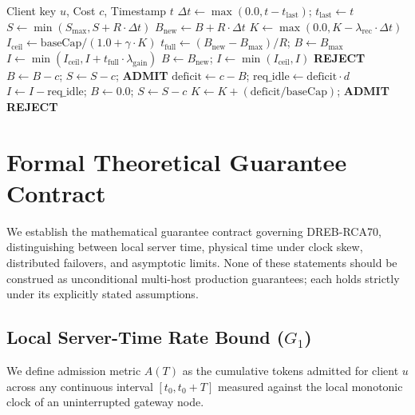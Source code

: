 \documentclass[conference]{IEEEtran}
\begin{document}
\begin{algorithm}[t]
\caption{DREB-RCA70 Atomic Admission Control}
\label{alg:dreb}
\begin{algorithmic}[1]
\REQUIRE Client key $u$, Cost $c$, Timestamp $t$
\STATE $\Delta t \leftarrow \max(0.0, t - t_{\text{last}})$; \quad $t_{\text{last}} \leftarrow t$
\STATE $S \leftarrow \min(S_{\max}, S + R \cdot \Delta t)$
\STATE $B_{\text{new}} \leftarrow B + R \cdot \Delta t$
\STATE $K \leftarrow \max(0.0, K - \lambda_{\text{rec}} \cdot \Delta t)$
\STATE $I_{\text{ceil}} \leftarrow \text{baseCap} / (1.0 + \gamma \cdot K)$
    \STATE $t_{\text{full}} \leftarrow (B_{\text{new}} - B_{\max}) / R$; \quad $B \leftarrow B_{\max}$
    \STATE $I \leftarrow \min(I_{\text{ceil}}, I + t_{\text{full}} \cdot \lambda_{\text{gain}})$
\ELSE
    \STATE $B \leftarrow B_{\text{new}}$; \quad $I \leftarrow \min(I_{\text{ceil}}, I)$
\ENDIF
{}
    \RETURN \textbf{REJECT}
\ENDIF
{}
    \STATE $B \leftarrow B - c$; \quad $S \leftarrow S - c$; \quad \RETURN \textbf{ADMIT}
\ELSE
    \STATE $\text{deficit} \leftarrow c - B$; \quad $\text{req\_idle} \leftarrow \text{deficit} \cdot d$
        \STATE $I \leftarrow I - \text{req\_idle}$; \quad $B \leftarrow 0.0$; \quad $S \leftarrow S - c$
        \STATE $K \leftarrow K + (\text{deficit} / \text{baseCap})$; \quad \RETURN \textbf{ADMIT}
    \ELSE
        \RETURN \textbf{REJECT}
    \ENDIF
\ENDIF
\end{algorithmic}
\end{algorithm}

\section{Formal Theoretical Guarantee Contract}

We establish the mathematical guarantee contract governing DREB-RCA70, distinguishing between local server time, physical time under clock skew, distributed failovers, and asymptotic limits. None of these statements should be construed as unconditional multi-host production guarantees; each holds strictly under its explicitly stated assumptions.

\subsection{Local Server-Time Rate Bound ($G_1$)}
We define admission metric $A(T)$ as the cumulative tokens admitted for client $u$ across any continuous interval $[t_0, t_0 + T]$ measured against the local monotonic clock of an uninterrupted gateway node.
\end{document}
